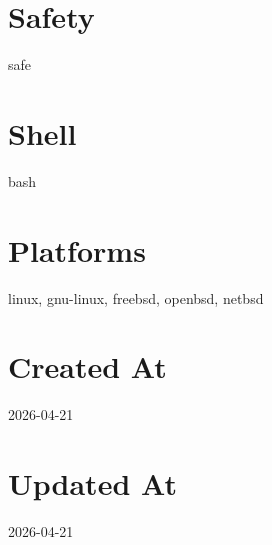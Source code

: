 \documentclass{article}
\begin{document}
\section*{Safety}
safe

\section*{Shell}
bash

\section*{Platforms}
linux, gnu-linux, freebsd, openbsd, netbsd

\section*{Created At}
2026-04-21

\section*{Updated At}
2026-04-21
\end{document}
